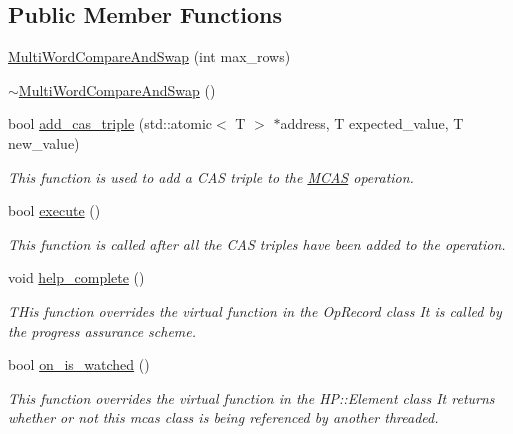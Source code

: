 \subsection*{Public Member Functions}
\begin{DoxyCompactItemize}
\item 
\hyperlink{classtervel_1_1algorithms_1_1wf_1_1mcas_1_1_multi_word_compare_and_swap_ac31e0f21642273902a26d2858778c57c}{Multi\+Word\+Compare\+And\+Swap} (int max\+\_\+rows)
\item 
\hyperlink{classtervel_1_1algorithms_1_1wf_1_1mcas_1_1_multi_word_compare_and_swap_abb6ccc2c0fc9c52e741b4a7b544f4ec9}{$\sim$\+Multi\+Word\+Compare\+And\+Swap} ()
\item 
bool \hyperlink{classtervel_1_1algorithms_1_1wf_1_1mcas_1_1_multi_word_compare_and_swap_adb40351c3953d749ff9a57237730846a}{add\+\_\+cas\+\_\+triple} (std\+::atomic$<$ T $>$ $\ast$address, T expected\+\_\+value, T new\+\_\+value)
\begin{DoxyCompactList}\small\item\em This function is used to add a C\+A\+S triple to the \hyperlink{classtervel_1_1algorithms_1_1wf_1_1mcas_1_1_m_c_a_s}{M\+C\+A\+S} operation. \end{DoxyCompactList}\item 
bool \hyperlink{classtervel_1_1algorithms_1_1wf_1_1mcas_1_1_multi_word_compare_and_swap_a3cf56f32c7579f734b1e0ecbd8d9c7f3}{execute} ()
\begin{DoxyCompactList}\small\item\em This function is called after all the C\+A\+S triples have been added to the operation. \end{DoxyCompactList}\item 
void \hyperlink{classtervel_1_1algorithms_1_1wf_1_1mcas_1_1_multi_word_compare_and_swap_a2581e26f73e07c80473cf2999cf45652}{help\+\_\+complete} ()
\begin{DoxyCompactList}\small\item\em T\+His function overrides the virtual function in the Op\+Record class It is called by the progress assurance scheme. \end{DoxyCompactList}\item 
bool \hyperlink{classtervel_1_1algorithms_1_1wf_1_1mcas_1_1_multi_word_compare_and_swap_aa5ee7cf4770a925939b9e7497b34473a}{on\+\_\+is\+\_\+watched} ()
\begin{DoxyCompactList}\small\item\em This function overrides the virtual function in the H\+P\+::\+Element class It returns whether or not this mcas class is being referenced by another threaded. \end{DoxyCompactList}\end{DoxyCompactItemize}
